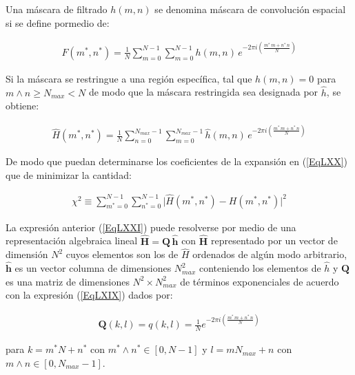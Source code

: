 Una m\'ascara de filtrado $h(m, n)$ se denomina m\'ascara de convoluci\'on espacial si se define pormedio de:

\begin{eqnarray}
	F(m^*, n^*) = \frac{1}{N} \sum _{m=0}^{N-1} \sum _{m=0}^{N-1} h(m, n) \, e^{-2 \pi i \left( \frac{m^* \, m + n^* \, n}{N} \right)}
\label{EqLXIX}
\end{eqnarray}

Si la m\'ascara se restringue a una regi\'on espec\'ifica, tal que $h(m, n) = 0$ para $m \wedge n \ge N_{max} < N$ de modo que la m\'ascara restringida
sea designada por $\hat{h}$, se obtiene:

\begin{eqnarray}
	\hat{H}(m^*, n^*) = \frac{1}{N} \sum _{n=0}^{N_{max}-1} \sum _{m=0}^{N_{max}-1} \hat{h}(m, n) \,
	e^{-2 \pi i \left( \frac{m^* \, m + n^* \, n}{N} \right)}
\label{EqLXX}
\end{eqnarray}

De modo que puedan determinarse los coeficientes de la expansi\'on en (\ref{EqLXX}) que de minimizar la cantidad:

\begin{eqnarray}
	\chi^2 \equiv \sum _{m^*=0}^{N-1} \sum _{n^*=0}^{N-1} \lvert \hat{H}(m^*, n^*) - H(m^*, n^*) \rvert^2
\label{EqLXXI}
\end{eqnarray}

La expresi\'on anterior (\ref{EqLXXI}) puede resolverse por medio de una representaci\'on algebraica lineal $\mathbf{\hat{H}} = \mathbf{Q} \, \mathbf{\hat{h}}$
con $\mathbf{\hat{H}}$ representado por un vector de dimensi\'on $N^2$ cuyos elementos son los de $\hat{H}$ ordenados de alg\'un modo arbitrario,
$\mathbf{\hat{h}}$ es un vector columna de dimensiones $N_{max}^2$ conteniendo los elementos de $\hat{h}$ y $\mathbf{Q}$ es una matriz de dimensiones
$N^2 \times N_{max}^2$ de t\'erminos exponenciales de acuerdo con la expresi\'on (\ref{EqLXIX}) dados por:

\begin{eqnarray}
	\mathbf{Q}(k, l) = q(k, l) = \frac{1}{N} e^{-2 \pi i \left( \frac{m^* \, m + n^* \, n}{N} \right)}
\label{EqLXXII}
\end{eqnarray}

para $k= m^* N + n^*$ con $m^* \wedge n^* \in [0, N-1]$ y $l= m N_{max} + n$ con $m \wedge n \in [0, N_{max}-1]$.
